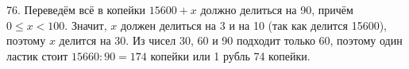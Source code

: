 76. Переведём всё в копейки $15600+x$ должно делиться на 90, причём $0\leqslant x <100.$ Значит, $x$ должен делиться на 3 и на 10 (так как делится 15600), поэтому $x$ делится на 30. Из чисел 30, 60 и 90 подходит только 60, поэтому один ластик стоит $15660:90=174$ копейки или 1 рубль 74 копейки.\\
